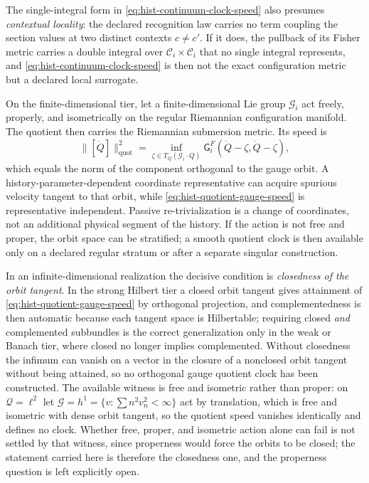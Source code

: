 The single-integral form in \eqref{eq:hist-continuum-clock-speed} also presumes
\emph{contextual locality}: the declared recognition law carries no term
coupling the section values at two distinct contexts $c\ne c'$.  If it does,
the pullback of its Fisher metric carries a double integral over
$\mathcal C_i\times\mathcal C_i$ that no single integral represents, and
\eqref{eq:hist-continuum-clock-speed} is then not the exact configuration
metric but a declared local surrogate.  

On the finite-dimensional tier, let a finite-dimensional Lie group
$\mathcal G_i$ act freely, properly, and isometrically on the regular
Riemannian configuration manifold.  The quotient then carries the Riemannian
submersion metric.  Its speed is
\begin{equation}
\|[\dot Q]\|_{\mathrm{quot}}^2
=\inf_{\zeta\in T_Q(\mathcal G_i\mathbin{\cdot}Q)}
\mathsf G_i^F(\dot Q-\zeta,\dot Q-\zeta),
\label{eq:hist-quotient-gauge-speed}
\end{equation}
which equals the norm of the component orthogonal to the gauge orbit.  A
history-parameter-dependent coordinate representative can acquire spurious velocity
tangent to that orbit, while
\eqref{eq:hist-quotient-gauge-speed} is representative independent.  Passive
re-trivialization is a change of coordinates, not an additional physical
segment of the history.  If the action is not free and proper, the orbit
space can be stratified; a smooth quotient clock is then available only on a
declared regular stratum or after a separate singular construction.

In an infinite-dimensional realization the decisive condition is
\emph{closedness of the orbit tangent}.  In the strong Hilbert tier a closed
orbit tangent gives attainment of \eqref{eq:hist-quotient-gauge-speed} by
orthogonal projection, and complementedness is then automatic because each
tangent space is Hilbertable; requiring closed \emph{and} complemented
subbundles is the correct generalization only in the weak or Banach tier, where
closed no longer implies complemented.  Without closedness the infimum can
vanish on a vector in the closure of a nonclosed orbit tangent without being
attained, so no orthogonal gauge quotient clock has been constructed.  The
available witness is free and isometric rather than proper: on
$\mathcal Q=\ell^2$ let $\mathcal G=h^1=\{v:\sum n^2v_n^2<\infty\}$ act by
translation, which is free and isometric with dense orbit tangent, so the
quotient speed vanishes identically and defines no clock.  Whether free,
proper, and isometric action alone can fail is not settled by that witness,
since properness would force the orbits to be closed; the statement carried
here is therefore the closedness one, and the properness question is left
explicitly open.  

